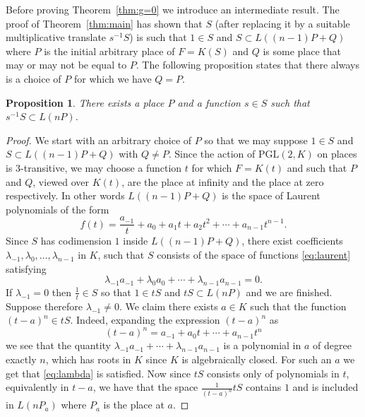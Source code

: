 \documentclass{article}
\theoremstyle{plain}
\newtheorem{prop}[thm]{Proposition}
\theoremstyle{definition}
\theoremstyle{remark}
\begin{document}
Before proving Theorem~\ref{thm:g=0} we introduce an intermediate
result. The proof of Theorem~\ref{thm:main} has shown that $S$
(after replacing it by a suitable multiplicative translate $s^{-1}S$) 
is such that $1\in S$ and $S\subset L((n-1)P+Q)$ where $P$ is the
initial arbitrary place of $F=K(S)$ and $Q$ is some place that may or may
not be equal to $P$. The following proposition states that there
always is a choice of $P$ for which we have $Q=P$.

\begin{prop}\label{prop:goodP}
  There exists a place $P$ and a function $s\in S$ such that
  $s^{-1}S\subset L(nP)$.
\end{prop}

\begin{proof}
  We start with an arbitrary choice of $P$ so that we may suppose
   $1\in S$ and $S\subset L((n-1)P+Q)$ with $Q\neq P$. Since the
   action of $\mathrm{PGL}(2,K)$ on places is $3$-transitive, we may
   choose a function $t$ for which $F=K(t)$ and such that $P$ and $Q$,
   viewed over $K(t)$, are the place at infinity and the place at zero
   respectively. In other words $L((n-1)P+Q)$ is the space of Laurent
   polynomials of the form
   \begin{equation}
     \label{eq:laurent}
     f(t)=\frac {a_{-1}} t + a_0 + a_1  t + a_2 t^2 + \cdots + a_{n-1}
   t^{n-1}.
   \end{equation}
   Since $S$ has codimension $1$ inside $L((n-1)P+Q)$, there exist
   coefficients $\lambda_{-1},\lambda_0,\ldots,\lambda_{n-1}$ in $K$,
   such that $S$ consists of the space of functions \eqref{eq:laurent}
   satisfying 
   \begin{equation}
     \label{eq:lambda}
     \lambda_{-1}a_{-1}+\lambda_0a_0+\cdots + \lambda_{n-1}a_{n-1} = 0.
   \end{equation}
    If $\lambda_{-1}=0$ then $\frac{1}{t}\in S$ so that $1\in tS$ and
   $tS\subset L(nP)$ and we are finished.
   Suppose therefore $\lambda_{-1}\neq 0$. We claim there exists $a\in
   K$ such that the function $(t-a)^n\in tS$. Indeed, expanding the
   expression $(t-a)^n$ as
   $$(t-a)^n=a_{-1}+a_0t+\cdots +a_{n-1}t^n$$
   we see that the quantity $\lambda_{-1}a_{-1}+\cdots +
   \lambda_{n-1}a_{n-1}$ is a polynomial in $a$ of degree exactly $n$,
   which has roots in $K$
   since $K$ is algebraically closed. For such an $a$ we get that
   \eqref{eq:lambda} is satisfied. Now since $tS$ consists only of
   polynomials in $t$, equivalently in $t-a$, we have that the space 
   $\frac 1{(t-a)^n}tS$ contains $1$ and is included in $L(nP_a)$
   where $P_a$ is the place at $a$.
\end{proof}
\end{document}
